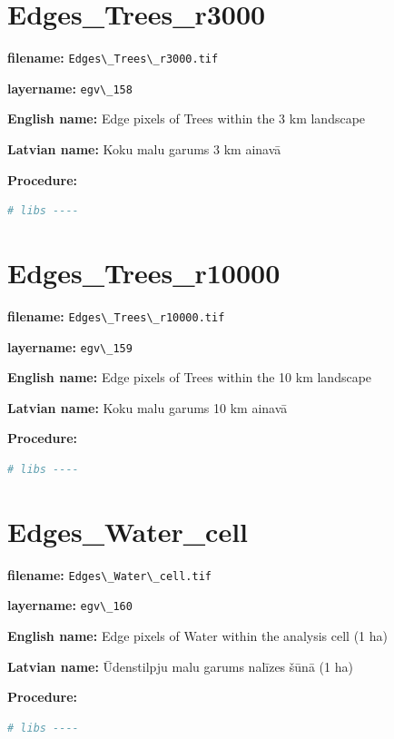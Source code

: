 \documentclass[
]{book}
\newcommand{\passthrough}[1]{#1}
\begin{document}
\section{Edges\_Trees\_r3000}\label{ch06.158}

\textbf{filename:} \passthrough{\lstinline!Edges\_Trees\_r3000.tif!}

\textbf{layername:} \passthrough{\lstinline!egv\_158!}

\textbf{English name:} Edge pixels of Trees within the 3 km landscape

\textbf{Latvian name:} Koku malu garums 3 km ainavā

\textbf{Procedure:}

\begin{lstlisting}[language=R]
# libs ----
\end{lstlisting}

\section{Edges\_Trees\_r10000}\label{ch06.159}

\textbf{filename:} \passthrough{\lstinline!Edges\_Trees\_r10000.tif!}

\textbf{layername:} \passthrough{\lstinline!egv\_159!}

\textbf{English name:} Edge pixels of Trees within the 10 km landscape

\textbf{Latvian name:} Koku malu garums 10 km ainavā

\textbf{Procedure:}

\begin{lstlisting}[language=R]
# libs ----
\end{lstlisting}

\section{Edges\_Water\_cell}\label{ch06.160}

\textbf{filename:} \passthrough{\lstinline!Edges\_Water\_cell.tif!}

\textbf{layername:} \passthrough{\lstinline!egv\_160!}

\textbf{English name:} Edge pixels of Water within the analysis cell (1 ha)

\textbf{Latvian name:} Ūdenstilpju malu garums nalīzes šūnā (1 ha)

\textbf{Procedure:}

\begin{lstlisting}[language=R]
# libs ----
\end{lstlisting}
\end{document}
